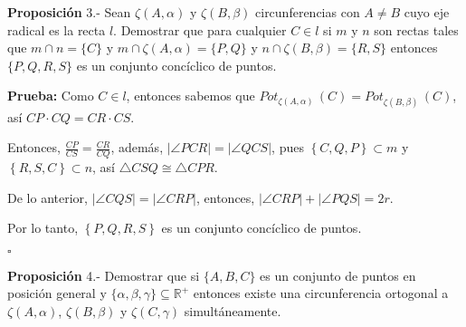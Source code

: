 \documentclass[12pt]{beamer}
\theoremstyle{definition}
\newenvironment{prop}{\begin{block}{\textbf{Proposición}}}{\end{block}}
\newenvironment{pba}{\noindent\textbf{Prueba:}}{\begin{flushright} $\square$
\end{flushright}}
\newcommand{\R}{\mathbb R}
\begin{document}
\begin{frame}
\begin{prop}
3.- Sean $\zeta(A,\alpha)$ y $\zeta(B,\beta)$ circunferencias con $A \neq B$ cuyo eje radical es la recta $l$. Demostrar que para cualquier $C \in l$ si $m$ y $n$ son rectas tales que $m \cap n = \{C\}$ y $m \cap \zeta(A, \alpha) = \{P,Q\}$ y $n \cap \zeta(B, \beta) = \{R,S\}$ entonces $\{P,Q,R,S\}$ es un conjunto concíclico de puntos.
\end{prop}
\end{frame}


\begin{frame}
\begin{pba}
Como $C \in l$, entonces sabemos que $Pot_{\zeta(A, \alpha)} \, (C) =  Pot_{\zeta(B, \beta)} \, (C)$, así $CP \cdot CQ = CR \cdot CS$.

\vspace{0.3cm}

Entonces, $\frac{CP}{CS} = \frac{CR}{CQ}$, además, $| \angle PCR | = | \angle QCS|$, pues $\left\lbrace C, Q, P \right\rbrace \subset m$ y $\left\lbrace R, S, C \right\rbrace \subset n$, así $\triangle CSQ \cong \triangle CPR$. 

\vspace{0.3cm}

De lo anterior, $|\angle CQS| = |\angle CRP|$, entonces, $|\angle CRP| + |\angle PQS| = 2r$. 

\vspace{0.3cm}

Por lo tanto, $\left\lbrace P,Q,R,S\right\rbrace$ es un conjunto concíclico de puntos.
\end{pba}
\end{frame}


\begin{frame}
\begin{prop}
4.- Demostrar que si $\{A,B,C\}$ es un conjunto de puntos en posición general y $\{\alpha, \beta,\gamma\} \subseteq \R^+$ entonces existe una circunferencia ortogonal a $\zeta(A,\alpha)$, $\zeta(B,\beta)$ y $\zeta(C,\gamma)$ simultáneamente.
\end{prop}
\end{frame}
\end{document}
